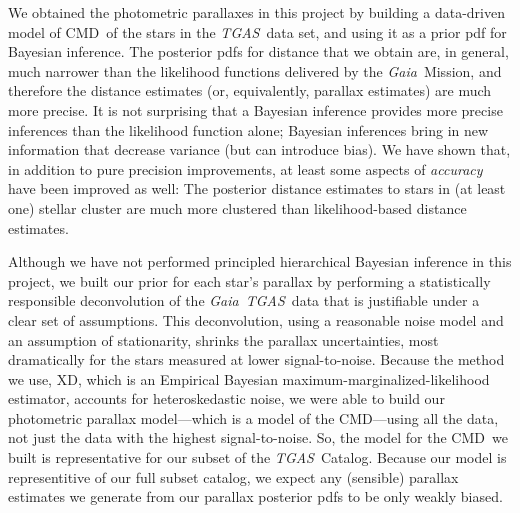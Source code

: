 \documentclass[modern]{aastex61}
\newcommand{\acronym}[1]{{\small{#1}}}
\newcommand{\project}[1]{\textsl{#1}}
\newcommand{\tgas}{\project{\acronym{TGAS}}}
\newcommand{\gaia}{\project{Gaia}}
\newcommand{\xd}{\acronym{XD}}
\newcommand{\cmd}{\acronym{CMD}}
\begin{document}
We obtained the photometric parallaxes in this project
by building a data-driven model of \cmd\ of the stars in the \tgas\ data set,
and using it as a prior pdf for Bayesian inference.
The posterior pdfs for distance that we obtain are, in general, much
narrower than the likelihood functions delivered by the
\gaia\ Mission, and therefore the distance estimates (or,
equivalently, parallax estimates) are much more precise.
It is not surprising that a Bayesian inference provides more
precise inferences than the likelihood function alone; Bayesian
inferences bring in new information that decrease variance (but
can introduce bias).
We have shown that, in addition to pure precision improvements, at
least some aspects of \emph{accuracy} have been improved as well:
The posterior distance estimates to stars in (at least one) stellar
cluster are much more clustered than likelihood-based distance
estimates.

Although we have not performed principled hierarchical Bayesian inference in this
project, we built our prior for each star's parallax by
performing a statistically responsible deconvolution
of the \gaia\ \tgas\ data that is justifiable under a clear set of
assumptions.
This deconvolution, using a reasonable noise model and an
assumption of stationarity, shrinks the parallax uncertainties, most dramatically for the stars measured at lower signal-to-noise.
Because the method we use, \xd, which is
an Empirical Bayesian maximum-marginalized-likelihood estimator, accounts for
heteroskedastic noise, we were able to build our photometric parallax
model---which is a model of the \cmd---using
all the data, not just the data with the highest signal-to-noise.
So, the model for the \cmd\ we built is representative for
our subset of the \tgas\ Catalog.
Because our model is representitive of our full subset catalog, we expect any (sensible) parallax estimates
we generate from our parallax posterior pdfs to be only weakly biased.
\end{document}
